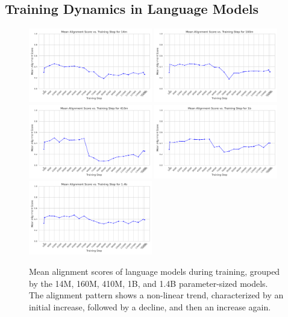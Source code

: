 \documentclass[10pt,a4paper]{article}
\begin{document}
\subsection{Training Dynamics in Language Models}
\begin{figure}[H]
    \centering
    \includegraphics[width=0.48\textwidth]{mean_alignment_score_14m.png}
    \includegraphics[width=0.48\textwidth]{mean_alignment_score_160m.png}
    \includegraphics[width=0.48\textwidth]{mean_alignment_score_410m.png}
    \includegraphics[width=0.48\textwidth]{mean_alignment_score_1b.png}
    \includegraphics[width=0.48\textwidth]{mean_alignment_score_1.4b.png}
    \caption{Mean alignment scores of language models during training, grouped by the 14M, 160M, 410M, 1B, and 1.4B parameter-sized models. The alignment pattern shows a non-linear trend, characterized by an initial increase, followed by a decline, and then an increase again.}
    \label{fig:llm_training_alignment}
\end{figure}
\end{document}
